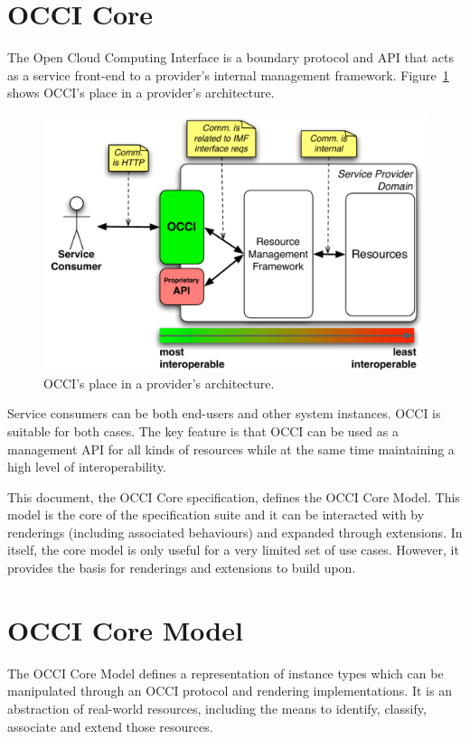 \documentclass[10pt,a4paper]{article}
\begin{document}
\section{OCCI Core}
The Open Cloud Computing Interface is a boundary protocol and API that
acts as a service front-end to a provider's internal management
framework. Figure~\ref{fig:placement} shows OCCI's place in a
provider's architecture.

\begin{figure}[h]
  \centering
  \includegraphics[scale=0.5]{figs/occi-intro.pdf}
  \caption{OCCI's place in a provider's architecture.}
  \label{fig:placement}
\end{figure}

Service consumers can be both end-users and other system
instances. OCCI is suitable for both cases. The key feature is that
OCCI can be used as a management API for all kinds of resources while
at the same time maintaining a high level of interoperability.

This document, the OCCI Core specification, defines the OCCI Core
Model. This model is the core of the specification suite and it can be
interacted with by renderings (including associated behaviours) and
expanded through extensions. In itself, the core model is only useful
for a very limited set of use cases. However, it provides the basis
for renderings and extensions to build upon.

\section{OCCI Core Model}
The OCCI Core Model defines a representation of instance types which
can be manipulated through an OCCI protocol and rendering implementations.
It is an abstraction of real-world resources, including the means to identify,
classify, associate and extend those resources.
\end{document}

